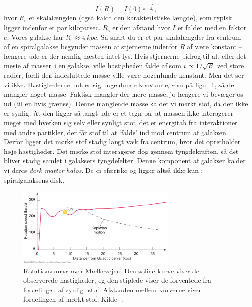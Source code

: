 \begin{equation}
I(R) = I(0) e^{-\frac{R}{R_\text{s}}},
\end{equation}
hvor $R_\text{s}$ er skalalængden (også kaldt den karakteristiske længde), som typisk ligger indenfor et par kiloparsec. $R_\text{s}$ er den afstand hvor $I$ er faldet med en faktor $e$. Vores galakse har $R_\text{s}\approx \SI{4}{kpc}$. Så snart du er et par skalalængder fra centrum af en spiralgalakse begynder massen af stjernerne indenfor $R$ af være konstant -- længere ude er der nemlig næsten intet lys. Hvis stjernerne bidrog til alt eller det meste af massen i en galakse, ville hastigheden falde af som $v \propto 1/\sqrt{R}$ ved store radier, fordi den indesluttede masse ville være nogenlunde konstant. Men det ser vi ikke. Hastighederne holder sig nogenlunde konstante, som på figur \ref{rotationskurve}, så der mangler noget masse. Faktisk mangler der mere masse, jo længere vi bevæger os ud (til en hvis grænse). Denne manglende masse kalder vi mørkt stof, da den ikke er synlig. At den ligger så langt ude er et tegn på, at massen ikke interagerer meget med hverken sig selv eller synligt stof, det er energitab fra interaktioner med andre partikler, der får stof til at `falde' ind mod centrum af galaksen. Derfor ligger det mørke stof stadig langt væk fra centrum, hvor det opretholder høje hastigheder. Det mørke stof interagerer dog gennem tyngdekraften, så det bliver stadig samlet i galaksers tyngdefelter. Denne komponent af galakser kalder vi deres \emph{dark matter halos}. De er sfæriske og ligger altså ikke kun i spiralgalaksens disk. \\

\begin{figure}[t]
	\centering
	\includegraphics[width=0.7\textwidth]{Kosmo/2017/img/rotationskurve.jpg}
	\caption{Rotationskurve over Mælkevejen. Den solide kurve viser de observerede hastigheder, og den stiplede viser de forventede fra fordelingen af synligt stof. Afstanden mellem kurverne viser fordelingen af mørkt stof. Kilde: \cite{brauRotationMilkyWay}.
		}
	\label{rotationskurve}
\end{figure}

